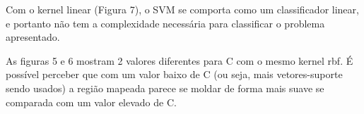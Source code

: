 \documentclass[a4paper, 12pt]{article}
\begin{document}
Com o kernel linear (Figura 7), o SVM se comporta como um classificador linear, e portanto não tem a complexidade necessária para classificar o problema apresentado.

As figuras 5 e 6 mostram 2 valores diferentes para C com o mesmo kernel rbf. É possível perceber que com um valor baixo de C (ou seja, mais vetores-suporte sendo usados) a região mapeada parece se moldar de forma mais suave se comparada com um valor elevado de C.
\end{document}
